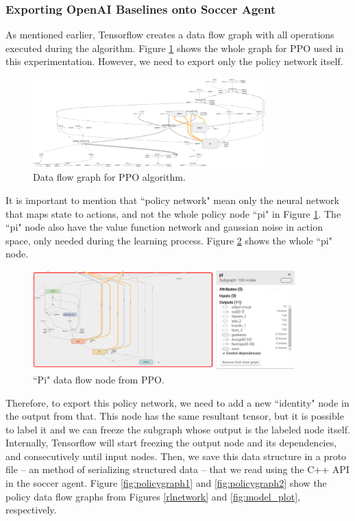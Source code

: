 \subsubsection{Exporting OpenAI Baselines onto Soccer Agent}

As mentioned earlier, Tensorflow creates a data flow graph with all operations executed during the algorithm. Figure \ref{fig:dataflowgraph} shows the whole graph for PPO used in this experimentation. However, we need to export only the policy network itself.

\begin{figure}[!htbp]
	\centering
	\includegraphics[width=0.8\textwidth]{Cap5/dataflowgraph.eps}
	\caption{Data flow graph for PPO algorithm.
	}
	\label{fig:dataflowgraph}
\end{figure}

It is important to mention that ``policy network" mean only the neural network that maps state to actions, and not the whole policy node ``pi" in Figure \ref{fig:dataflowgraph}. The ``pi" node also have the value function network and gaussian noise in action space, only needed during the learning process. Figure \ref{fig:pigraph} shows the whole ``pi" node.

\begin{figure}[!htbp]
	\centering
	\includegraphics[width=0.9\textwidth]{Cap5/pigraph.eps}
	\caption{ ``Pi" data flow node from PPO.
	}
	\label{fig:pigraph}
\end{figure}

Therefore, to export this policy network, we need to add a new ``identity" node in the output from that. This node has the same resultant tensor, but it is possible to label it and we can freeze the subgraph whose output is the labeled node itself. Internally, Tensorflow will start freezing the output node and its dependencies, and consecutively	 until input nodes. Then, we save this data structure in a proto file -- an method of serializing structured data -- that we read using the C++ API in the soccer agent. Figure \ref{fig:policygraph1} and \ref{fig:policygraph2} show the policy data flow graphs from Figures \ref{rlnetwork} and \ref{fig:model_plot}, respectively.



